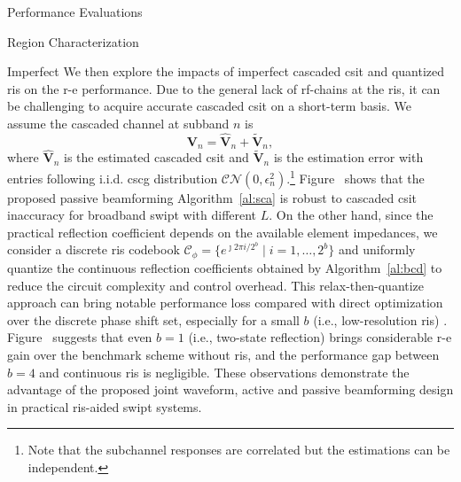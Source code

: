 \begin{section}{Performance Evaluations}
\begin{subsection}{ Region Characterization}
\begin{subsubsection}{Imperfect }
			We then explore the impacts of imperfect cascaded \gls{csit} and quantized \gls{ris} on the \gls{r-e} performance. Due to the general lack of \gls{rf}-chains at the \gls{ris}, it can be challenging to acquire accurate cascaded \gls{csit} on a short-term basis. We assume the cascaded channel at subband $n$ is
			\begin{equation}
				\mathbf{V}_{n} = \hat{\mathbf{V}}_{n} + \tilde{\mathbf{V}}_{n},
			\end{equation}
			where $\hat{\mathbf{V}}_{n}$ is the estimated cascaded \gls{csit} and $\tilde{\mathbf{V}}_{n}$ is the estimation error with entries following i.i.d. \gls{cscg} distribution $\mathcal{CN}(0, \epsilon_{n}^2)$.\footnote{Note that the subchannel responses are correlated but the estimations can be independent.} Figure~ shows that the proposed passive beamforming Algorithm~\ref{al:sca} is robust to cascaded \gls{csit} inaccuracy for broadband \gls{swipt} with different $L$. On the other hand, since the practical reflection coefficient depends on the available element impedances, we consider a discrete \gls{ris} codebook $\mathcal{C}_\phi = \{e^{\jmath 2 \pi i / 2^b} \mid i = 1, \dots, 2^b\}$ and uniformly quantize the continuous reflection coefficients obtained by Algorithm~\ref{al:bcd} to reduce the circuit complexity and control overhead. This relax-then-quantize approach can bring notable performance loss compared with direct optimization over the discrete phase shift set, especially for a small $b$ (i.e., low-resolution \gls{ris}) \cite{Wu2020c}. Figure~ suggests that even $b=1$ (i.e., two-state reflection) brings considerable \gls{r-e} gain over the benchmark scheme without \gls{ris}, and the performance gap between $b=4$ and continuous \gls{ris} is negligible. These observations demonstrate the advantage of the proposed joint waveform, active and passive beamforming design in practical \gls{ris}-aided \gls{swipt} systems.
		\end{subsubsection}
	\end{subsection}
\end{section}


